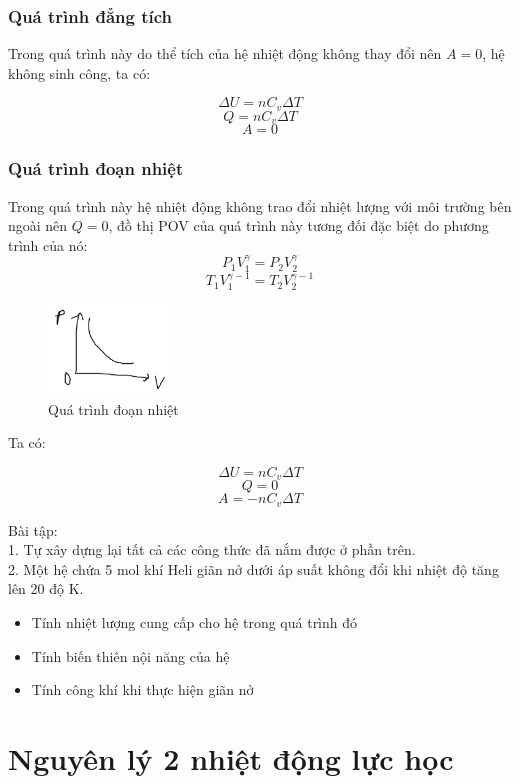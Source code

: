 \subsubsection{Quá trình đẳng tích}
Trong quá trình này do thể tích của hệ nhiệt động không thay đổi nên $A=0$, hệ không sinh công, ta có:
\begin{tcolorbox}
    $$\Delta U=nC_{v}\Delta T$$
    $$Q=nC_{v}\Delta T$$
    $$A=0$$
\end{tcolorbox}
\subsubsection{Quá trình đoạn nhiệt}
Trong quá trình này hệ nhiệt động không trao đổi nhiệt lượng với môi trường bên ngoài nên $Q=0$, đồ thị POV của quá trình này tương đối đặc biệt do phương trình của nó:
$$P_{1}V_{1}^{\gamma}=P_{2}V_{2}^{\gamma}$$
$$T_{1}V_{1}^{\gamma-1}=T_{2}V_{2}^{\gamma-1}$$
\begin{figure}
    \centering
    \includegraphics[width=0.3\textwidth]{dang_nhiet.png}
    \caption{Quá trình đoạn nhiệt}
    \label{doan_nhiet}
\end{figure}
Ta có:
\begin{tcolorbox}
    $$\Delta U=nC_{v}\Delta T$$
    $$Q=0$$
    $$A=-nC_{v}\Delta T$$
\end{tcolorbox}
Bài tập:
\\1. Tự xây dựng lại tất cả các công thức đã nắm được ở phần trên.
\\2. Một hệ chứa 5 mol khí Heli giãn nở dưới áp suất không đổi khi nhiệt độ tăng lên 20 độ K.
\begin{itemize}
    \item Tính nhiệt lượng cung cấp cho hệ trong quá trình đó
    \item Tính biến thiên nội năng của hệ
    \item Tính công khí khi thực hiện giãn nở
\end{itemize}
\section{Nguyên lý 2 nhiệt động lực học}
